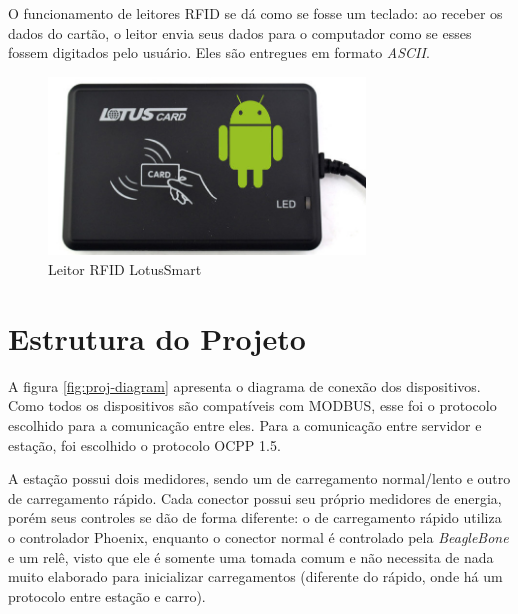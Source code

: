       O funcionamento de leitores \ac{RFID} se dá como se fosse um teclado: ao receber os dados do cartão, o leitor envia seus dados para o computador como se esses fossem digitados pelo usuário. Eles são entregues em formato \textit{ASCII}.

      \begin{figure}[H]
        \begin{center}
          \includegraphics[width=0.75\textwidth,natwidth=655,natheight=368]{assets/images/devices-rfid.jpg}
          \caption{Leitor RFID LotusSmart}
          \label{fig:ihm}
        \end{center}
      \end{figure}

  \section{Estrutura do Projeto}

    A figura \ref{fig:proj-diagram} apresenta o diagrama de conexão dos dispositivos. Como todos os dispositivos são compatíveis com MODBUS, esse foi o protocolo escolhido para a comunicação entre eles. Para a comunicação entre servidor e estação, foi escolhido o protocolo \ac{OCPP} 1.5.

    A estação possui dois medidores, sendo um de carregamento normal/lento e outro de carregamento rápido. Cada conector possui seu próprio medidores de energia, porém seus controles se dão de forma diferente: o de carregamento rápido utiliza o controlador Phoenix, enquanto o conector normal é controlado pela \textit{BeagleBone} e um relê, visto que ele é somente uma tomada comum e não necessita de nada muito elaborado para inicializar carregamentos (diferente do rápido, onde há um protocolo entre estação e carro).

